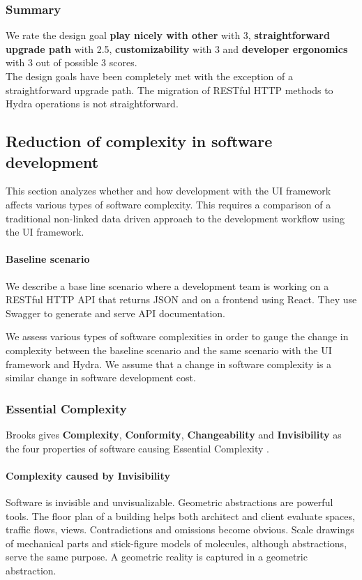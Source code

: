 \subsubsection{Summary}
We rate the design goal \textbf{play nicely with other} with 3, \textbf{straightforward upgrade path} with 2.5, \textbf{customizability} with 3 and \textbf{developer ergonomics} with 3 out of possible 3 scores. \\ The design goals have been completely met with the exception of a straightforward upgrade path. The migration of RESTful HTTP methods to Hydra operations is not straightforward.

\subsection{Reduction of complexity in software development}
This section analyzes whether and how development with the UI framework affects various types of software complexity. This requires a comparison of a traditional non-linked data driven approach to the development workflow using the UI framework. \\

\paragraph{Baseline scenario} We describe a base line scenario where a development team is working on a RESTful HTTP API that returns JSON and on a frontend using React. They use Swagger to generate and serve API documentation.

We assess various types of software complexities in order to gauge the change in complexity between the baseline scenario and the same scenario with the UI framework and Hydra. We assume that a change in software complexity is a similar change in software development cost.

\subsubsection{Essential Complexity}
Brooks gives \textbf{Complexity}, \textbf{Conformity}, \textbf{Changeability} and \textbf{Invisibility} as the four properties of software causing Essential Complexity \citep{nosilverbullet}.

\paragraph{Complexity caused by Invisibility}
Software is invisible and unvisualizable. Geometric abstractions are powerful tools. The floor plan of a building helps both architect and client evaluate spaces, traffic flows, views. Contradictions and omissions become obvious. Scale drawings of mechanical parts and stick-figure models of molecules, although abstractions, serve the same purpose. A geometric reality is captured in a geometric abstraction.

